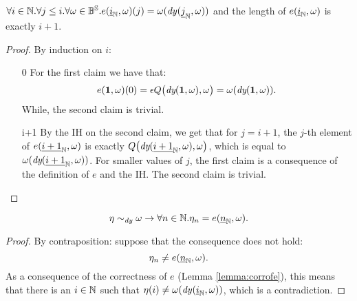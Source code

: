 \begin{lemma}[Correctness of $e$]
  \label{lemma:corrofe}
  $\forall i \in \mathbb{N}.\forall j \le i. \forall \omega \in \mathbb{B}^{\mathbb{S}}. e({\underline {i}}_{\mathbb{N}}, \omega)(j) = \omega(\mathit{dy}({\underline {j}}_{\mathbb{N}}, \omega))$
  and the length of $e({\underline {i}}_{\mathbb{N}}, \omega)$ is exactly $i+1$.
\end{lemma}
\begin{proof}
  By induction on $i$:
  \begin{itemize}
    \item[0] For the first claim we have that:
    $$
    e(\mathbf{1}, \omega)(0)=\epsilon Q\big(\emph{dy}(\mathbf{1},\omega),\omega\big)= \omega(\emph{dy}(\mathbf{1},\omega)).
    $$
    While, the second claim is trivial.
    \item[i+1] By the IH on the second claim, we get that for $j=i+1$, the
    $j$-th element of $e({\underline {i+1}}_{\mathbb{N}}, \omega)$ is exactly
    $Q\big(\emph{dy}({\underline {i+1}}_{\mathbb{N}},\omega), \omega \big)$, which is equal to
    $\omega(\emph{dy}({\underline {i+1}}_{\mathbb{N}},\omega))$. For smaller values of $j$,
    the first claim is a consequence of the definition of $e$ and the IH.
    The second claim is trivial.
  \end{itemize}\end{proof}


\begin{lemma}
  \label{lemma:auxsimdy}
  $$
  \eta \sim_{\mathit{dy}} \omega \to \forall n \in \mathbb{N}. \eta_n = e({\underline {n}}_{\mathbb{N}}, \omega).
  $$
\end{lemma}
\begin{proof}
  By contraposition: suppose that the consequence does not hold:
  $$
  \eta_n \neq e({\underline {n}}_{\mathbb{N}}, \omega).
  $$
  As a consequence of the correctness of $e$ (Lemma \ref{lemma:corrofe}),
  this means that there is an $i \in \mathbb{N}$ such that
  $\eta(i)\neq\omega(\mathit{dy}({\underline {i}}_{\mathbb{N}}, \omega))$,
  which is a contradiction.
\end{proof}
